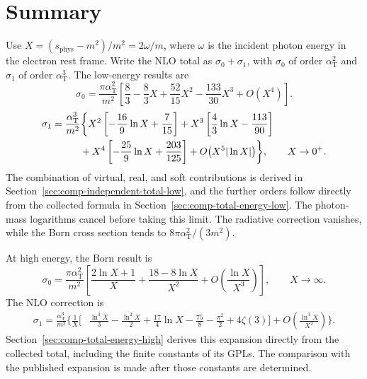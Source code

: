 \section{Summary}
\label{sec:comp-asymptotic-summary}
Use $X=(s_{\mathrm{phys}}-m^2)/m^2=2\omega/m$, where
$\omega$ is the incident photon energy in the electron rest frame.
Write the NLO total as $\sigma_0+\sigma_1$, with $\sigma_0$ of
order $\alpha_{\mathrm T}^2$ and $\sigma_1$ of order
$\alpha_{\mathrm T}^3$. The low-energy results are
\begin{equation}
 \sigma_0=\frac{\pi\alpha_{\mathrm T}^2}{m^2}
 \left[\frac83-\frac83X+\frac{52}{15}X^2
                   -\frac{133}{30}X^3+O(X^4)\right].
\end{equation}
\begin{equation}
\begin{aligned}
 \sigma_1&=\frac{\alpha_{\mathrm T}^3}{m^2}
 \biggl\{X^2\left[-\frac{16}{9}\ln X+\frac7{15}\right]
 +X^3\left[\frac43\ln X-\frac{113}{90}\right]\\
 &\hspace{10mm}+X^4\left[-\frac{25}{9}\ln X+\frac{203}{125}\right]
                   +O\!\left(X^5|\ln X|\right)\biggr\},
 \qquad X\to0^+.
\end{aligned}
\end{equation}
The combination of virtual, real, and soft contributions is derived in
Section~\ref{sec:comp-independent-total-low}, and the further orders follow
directly from the collected formula in Section~\ref{sec:comp-total-energy-low}.
The photon-mass logarithms
cancel before taking this limit. The radiative correction vanishes,
while the Born cross section tends to $8\pi\alpha_{\mathrm T}^2/(3m^2)$.

At high energy, the Born result is
\begin{equation}
 \sigma_0=\frac{\pi\alpha_{\mathrm T}^2}{m^2}
 \left[\frac{2\ln X+1}{X}+\frac{18-8\ln X}{X^2}
                +O\!\left(\frac{\ln X}{X^3}\right)\right],
 \qquad X\to\infty.
\end{equation}
The NLO correction is
\begin{equation}
\begin{aligned}
 \sigma_1=\frac{\alpha_{\mathrm T}^3}{m^2}\biggl\{
 \frac1X\biggl[&\frac{\ln^3X}{3}-\frac{\ln^2X}{2}
 +\frac{17}{4}\ln X-\frac{75}{8}-\frac{\pi^2}{2}+4\zeta(3)\biggr]
 +O\!\left(\frac{\ln^3X}{X^2}\right)\biggr\}.
\end{aligned}
\end{equation}
Section~\ref{sec:comp-total-energy-high} derives this expansion directly
from the collected total, including the finite constants of its GPLs.
The comparison with the published expansion is made after those
constants are determined.
